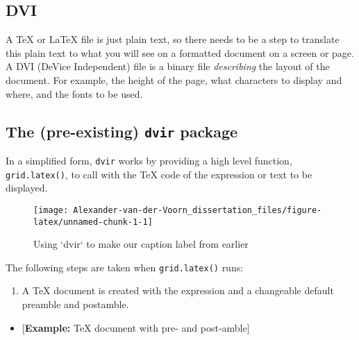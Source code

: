 \documentclass[]{article}
\newenvironment{Shaded}{\begin{snugshade}}{\end{snugshade}}
\newcommand{\KeywordTok}[1]{\textcolor[rgb]{0.13,0.29,0.53}{\textbf{#1}}}
\newcommand{\CharTok}[1]{\textcolor[rgb]{0.31,0.60,0.02}{#1}}
\newcommand{\StringTok}[1]{\textcolor[rgb]{0.31,0.60,0.02}{#1}}
\newcommand{\NormalTok}[1]{#1}
\providecommand{\tightlist}{%
  \setlength{\itemsep}{0pt}\setlength{\parskip}{0pt}}
\begin{document}
\subsection{DVI}\label{dvi}

A \TeX{} or \LaTeX{} file is just plain text, so there needs to be a
step to translate this plain text to what you will see on a formatted
document on a screen or page. A DVI (DeVice Independent) file is a
binary file \emph{describing} the layout of the document. For example,
the height of the page, what characters to display and where, and the
fonts to be used.

\subsection{\texorpdfstring{The (pre-existing) \texttt{dvir}
package}{The (pre-existing) dvir package}}\label{dvirDesc}

In a simplified form, \texttt{dvir} works by providing a high level
function, \texttt{grid.latex()}, to call with the \TeX{} code of the
expression or text to be displayed.

\begin{Shaded}
\end{Shaded}

\begin{figure}

{\centering \texttt{[image: Alexander-van-der-Voorn\_dissertation\_files/figure-latex/unnamed-chunk-1-1]} 

}

\caption{Using `dvir` to make our caption label from earlier}\label{fig:unnamed-chunk-1}
\end{figure}

The following steps are taken when \texttt{grid.latex()} runs:

\begin{enumerate}
\def\labelenumi{\arabic{enumi}.}
\tightlist
\item
  A \TeX{} document is created with the expression and a changeable
  default preamble and postamble.
\end{enumerate}

\begin{itemize}
\tightlist
\item
  {[}\textbf{Example:} TeX document with pre- and post-amble{]}
\end{itemize}
\end{document}

